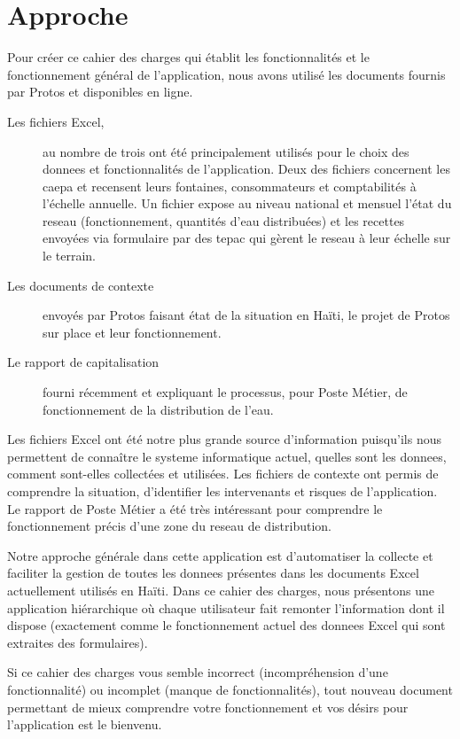 \documentclass[a4paper, 11pt]{article}
\begin{document}
\section{Approche \label{sec:approach}}
  Pour créer ce cahier des charges qui établit les fonctionnalités et le fonctionnement général de l'\gls{application}, nous avons utilisé les documents fournis par Protos et disponibles en ligne.
  \begin{description}
    \item[Les fichiers Excel,] au nombre de trois ont été principalement utilisés pour le choix des \glspl{donnee} et fonctionnalités de l'\gls{application}. Deux des fichiers concernent les \gls{caepa} et recensent leurs \glspl{fontaine}, \glspl{consommateur} et comptabilités à l'échelle annuelle. Un fichier expose au niveau national et mensuel l'état du \gls{reseau} (fonctionnement, quantités d'eau distribuées) et les recettes envoyées via formulaire par des \gls{tepac} qui gèrent le \gls{reseau} à leur échelle sur le terrain.
    \item[Les documents de contexte] envoyés par Protos faisant état de la situation en Haïti, le projet de Protos sur place et leur fonctionnement.
    \item[Le rapport de capitalisation] fourni récemment et expliquant le processus, pour Poste Métier, de fonctionnement de la distribution de l'eau.
  \end{description}
  Les fichiers Excel ont été notre plus grande source d'information puisqu'ils nous permettent de connaître le \gls{systeme} informatique actuel, quelles sont les \glspl{donnee}, comment sont-elles collectées et utilisées.
  Les fichiers de contexte ont permis de comprendre la situation, d'identifier les intervenants et risques de l'\gls{application}.
  Le rapport de Poste Métier a été très intéressant pour comprendre le fonctionnement précis d'une \gls{zone} du \gls{reseau} de distribution.

  Notre approche générale dans cette \gls{application} est d'automatiser la collecte et faciliter la gestion de toutes les \glspl{donnee} présentes dans les documents Excel actuellement utilisés en Haïti. Dans ce cahier des charges, nous présentons une \gls{application} hiérarchique où chaque \gls{utilisateur} fait remonter l'information dont il dispose (exactement comme le fonctionnement actuel des \glspl{donnee} Excel qui sont extraites des formulaires).

  \begin{shaded}
    Si ce cahier des charges vous semble incorrect (incompréhension d'une fonctionnalité) ou incomplet (manque de fonctionnalités), tout nouveau document permettant de mieux comprendre votre fonctionnement et vos désirs pour l'\gls{application} est le bienvenu.
  \end{shaded}
\end{document}
